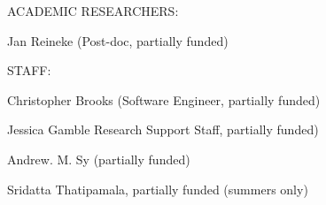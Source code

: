                \begin{indentation}{0pt}{0pt}{0pt}
                 \uppercase{ACADEMIC RESEARCHERS:}
               \end{indentation}
   	       \begin{indentation}{0pt}{0pt}{36pt}
                 Jan Reineke (Post-doc, partially funded)
               \end{indentation}

               \begin{indentation}{0pt}{0pt}{0pt}
               \end{indentation}

               \begin{indentation}{0pt}{0pt}{0pt}
               \end{indentation}

               \begin{indentation}{0pt}{0pt}{0pt}
                 \uppercase{STAFF:}
               \end{indentation}

               \begin{indentation}{0pt}{0pt}{36pt}
                 Christopher Brooks (Software Engineer, partially funded)
               \end{indentation}

               \begin{indentation}{0pt}{0pt}{36pt}
                 Jessica Gamble Research Support Staff, partially funded)
               \end{indentation}

               \begin{indentation}{0pt}{0pt}{36pt}
                 Andrew. M. Sy (partially funded)
               \end{indentation}

               \begin{indentation}{0pt}{0pt}{36pt}
                 Sridatta Thatipamala, partially funded (summers only)
               \end{indentation}

               \begin{indentation}{0pt}{0pt}{0pt}
               \end{indentation}

               \begin{indentation}{0pt}{0pt}{0pt}
               \end{indentation}

